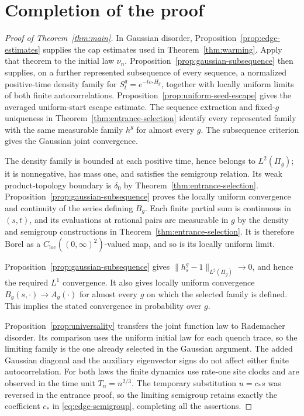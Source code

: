 \section{Completion of the proof}\label{sec:completion}

\begin{proof}[Proof of Theorem~\ref{thm:main}]
In Gaussian disorder, Proposition~\ref{prop:edge-estimates} supplies the
cap estimates used in Theorem~\ref{thm:warming}. Apply that theorem to
the initial law \(\nu_n\). Proposition~\ref{prop:gaussian-subsequence}
then supplies, on a
further represented subsequence of every sequence, a normalized
positive-time density family for \(S_t^g=e^{-tc_*H_g}\), together
with locally uniform limits of both finite autocorrelations.
Proposition~\ref{prop:uniform-seed-escape} gives the averaged uniform-start
escape estimate. The sequence extraction and fixed-\(g\) uniqueness in
Theorem~\ref{thm:entrance-selection} identify every represented family
with the same measurable family \(h^g\) for almost every \(g\).
The subsequence criterion gives the Gaussian joint convergence.

The density family is bounded at each positive time, hence belongs
to \(L^2(\Pi_g)\); it is nonnegative, has mass one, and satisfies the
semigroup relation. Its weak product-topology boundary is
\(\delta_0\) by Theorem~\ref{thm:entrance-selection}.
Proposition~\ref{prop:gaussian-subsequence} proves the locally uniform
convergence and continuity of the series defining \(B_g\).
Each finite partial sum is continuous in \((s,t)\), and its evaluations
at rational pairs are measurable in \(g\) by the density and semigroup
constructions in Theorem~\ref{thm:entrance-selection}. It is therefore
Borel as a \(C_{\mathrm{loc}}((0,\infty)^2)\)-valued map, and so is its
locally uniform limit.

Proposition~\ref{prop:gaussian-subsequence} gives
\(\|h_s^g-1\|_{L^2(\Pi_g)}\to0\), and hence the required
\(L^1\) convergence. It also gives locally uniform convergence
\(B_g(s,\cdot)\to A_g(\cdot)\) for almost every \(g\) on which the
selected family is defined.
This implies the stated convergence in probability over \(g\).

Proposition~\ref{prop:universality} transfers the joint function law
to Rademacher disorder. Its comparison uses the uniform initial law
for each quench trace, so the limiting family is the one already
selected in the Gaussian argument. The added Gaussian diagonal and
the auxiliary eigenvector signs do not affect either finite
autocorrelation. For both laws the finite dynamics use rate-one site
clocks and are observed in the time unit \(T_n=n^{2/3}\). The temporary
substitution \(u=c_*s\) was reversed in the entrance proof, so the
limiting semigroup retains exactly the coefficient \(c_*\) in
\eqref{eq:edge-semigroup},
completing all the assertions.
\end{proof}
